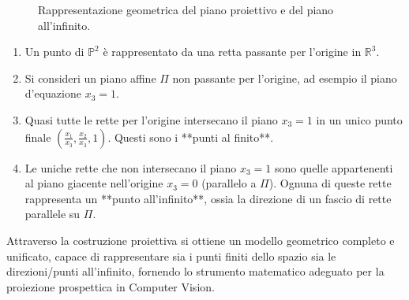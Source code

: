 \begin{figure}[h!]
    \centering
    \caption{Rappresentazione geometrica del piano proiettivo e del piano all'infinito.}
    \label{fig:piano_proiettivo}
\end{figure}

\begin{enumerate}
    \item Un punto di $\mathbb{P}^2$ è rappresentato da una retta passante per l'origine in $\mathbb{R}^3$.
    \item Si consideri un piano affine $\Pi$ non passante per l'origine, ad esempio il piano d'equazione $x_3 = 1$.
    \item Quasi tutte le rette per l'origine intersecano il piano $x_3 = 1$ in un unico punto finale $\left(\frac{x_1}{x_3}, \frac{x_2}{x_3}, 1\right)$. Questi sono i **punti al finito**.
    \item Le uniche rette che non intersecano il piano $x_3 = 1$ sono quelle appartenenti al piano giacente nell'origine $x_3 = 0$ (parallelo a $\Pi$). Ognuna di queste rette rappresenta un **punto all'infinito**, ossia la direzione di un fascio di rette parallele su $\Pi$.
\end{enumerate}

Attraverso la costruzione proiettiva si ottiene un modello geometrico completo e unificato, capace di rappresentare sia i punti finiti dello spazio sia le direzioni/punti all'infinito, fornendo lo strumento matematico adeguato per la proiezione prospettica in Computer Vision.